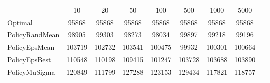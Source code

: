 \begin{tabular}[ht]{|l||c|c|c|c|c|c|c|H}
 & 10 & 20 & 50 & 100 & 500 & 1000 & 5000 & \\  
Optimal &95868 & 95868 & 95868 & 95868 & 95868 & 95868 & 95868 & \\ 
PolicyRandMean &98905 & 99303 & 98273 & 98034 & 99897 & 99218 & 99196 & \\ 
PolicyEpsMean &103719 & 102732 & 103541 & 100475 & 99932 & 100301 & 100664 & \\ 
PolicyEpsBest &110548 & 110198 & 109415 & 101247 & 103728 & 103688 & 103890 & \\ 
PolicyMuSigma &120849 & 111799 & 127288 & 123153 & 129434 & 117821 & 118757 & \\ 
\end{tabular}